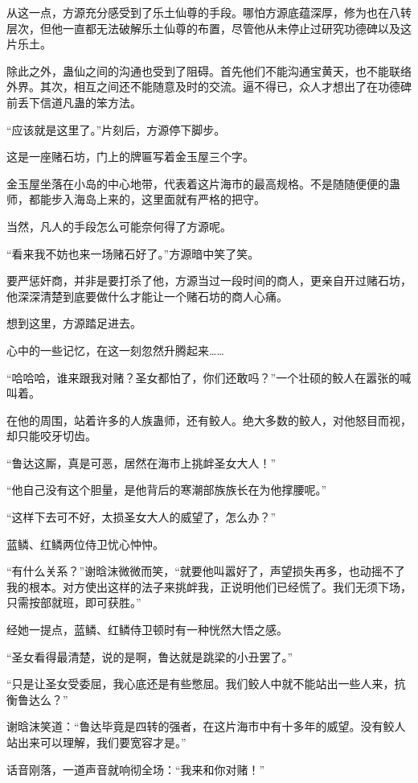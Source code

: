 \begin{this_body}
从这一点，方源充分感受到了乐土仙尊的手段。哪怕方源底蕴深厚，修为也在八转层次，但他一直都无法破解乐土仙尊的布置，尽管他从未停止过研究功德碑以及这片乐土。

除此之外，蛊仙之间的沟通也受到了阻碍。首先他们不能沟通宝黄天，也不能联络外界。其次，相互之间还不能随意及时的交流。逼不得已，众人才想出了在功德碑前丢下信道凡蛊的笨方法。

“应该就是这里了。”片刻后，方源停下脚步。

这是一座赌石坊，门上的牌匾写着金玉屋三个字。

金玉屋坐落在小岛的中心地带，代表着这片海市的最高规格。不是随随便便的蛊师，都能步入海岛上来的，这里面就有严格的把守。

当然，凡人的手段怎么可能奈何得了方源呢。

“看来我不妨也来一场赌石好了。”方源暗中笑了笑。

要严惩奸商，并非是要打杀了他，方源当过一段时间的商人，更亲自开过赌石坊，他深深清楚到底要做什么才能让一个赌石坊的商人心痛。

想到这里，方源踏足进去。

心中的一些记忆，在这一刻忽然升腾起来……

“哈哈哈，谁来跟我对赌？圣女都怕了，你们还敢吗？”一个壮硕的鲛人在嚣张的喊叫着。

在他的周围，站着许多的人族蛊师，还有鲛人。绝大多数的鲛人，对他怒目而视，却只能咬牙切齿。

“鲁达这厮，真是可恶，居然在海市上挑衅圣女大人！”

“他自己没有这个胆量，是他背后的寒潮部族族长在为他撑腰呢。”

“这样下去可不好，太损圣女大人的威望了，怎么办？”

蓝鳞、红鳞两位侍卫忧心忡忡。

“有什么关系？”谢晗沫微微而笑，“就要他叫嚣好了，声望损失再多，也动摇不了我的根本。对方使出这样的法子来挑衅我，正说明他们已经慌了。我们无须下场，只需按部就班，即可获胜。”

经她一提点，蓝鳞、红鳞侍卫顿时有一种恍然大悟之感。

“圣女看得最清楚，说的是啊，鲁达就是跳梁的小丑罢了。”

“只是让圣女受委屈，我心底还是有些憋屈。我们鲛人中就不能站出一些人来，抗衡鲁达么？”

谢晗沫笑道：“鲁达毕竟是四转的强者，在这片海市中有十多年的威望。没有鲛人站出来可以理解，我们要宽容才是。”

话音刚落，一道声音就响彻全场：“我来和你对赌！”


\end{this_body}
